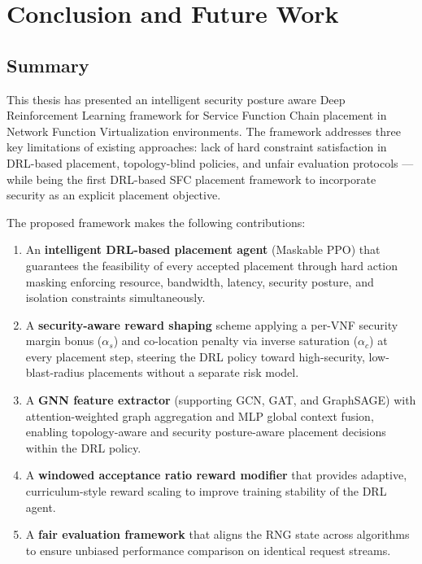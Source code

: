 \chapter{Conclusion and Future Work}

\section{Summary}

This thesis has presented an intelligent security posture aware Deep Reinforcement Learning framework for Service Function Chain placement in Network Function Virtualization environments. The framework addresses three key limitations of existing approaches: lack of hard constraint satisfaction in DRL-based placement, topology-blind policies, and unfair evaluation protocols --- while being the first DRL-based SFC placement framework to incorporate security as an explicit placement objective.

The proposed framework makes the following contributions:

\begin{enumerate}
  \item An \textbf{intelligent DRL-based placement agent} (Maskable PPO) that guarantees the feasibility of every accepted placement through hard action masking enforcing resource, bandwidth, latency, security posture, and isolation constraints simultaneously.
  \item A \textbf{security-aware reward shaping} scheme applying a per-VNF security margin bonus ($\alpha_s$) and co-location penalty via inverse saturation ($\alpha_c$) at every placement step, steering the DRL policy toward high-security, low-blast-radius placements without a separate risk model.
  \item A \textbf{GNN feature extractor} (supporting GCN, GAT, and GraphSAGE) with attention-weighted graph aggregation and MLP global context fusion, enabling topology-aware and security posture-aware placement decisions within the DRL policy.
  \item A \textbf{windowed acceptance ratio reward modifier} that provides adaptive, curriculum-style reward scaling to improve training stability of the DRL agent.
  \item A \textbf{fair evaluation framework} that aligns the RNG state across algorithms to ensure unbiased performance comparison on identical request streams.
\end{enumerate}


